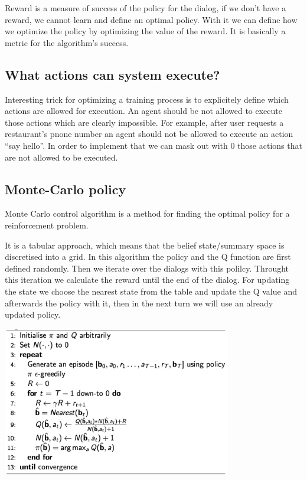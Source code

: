 \documentclass[12pt,titlepage,a4paper]{article}
\begin{document}
Reward is a measure of success of the policy for the dialog, if we don’t have a reward, we cannot learn and define an optimal policy. With it we can define how we optimize the policy by optimizing the value of the reward. It is basically a metric for the algorithm's success.

\subsection{What actions can system execute?}

Interesting trick for optimizing a training process is to explicitely define which actions are allowed for execution. An agent should be not allowed to execute those actions which are clearly impossible. For example, after user requests a restaurant's pnone number an agent should not be allowed to execute an action “say hello”. In order to implement that we can mask out with 0 those actions that are not allowed to be executed.

\subsection{Monte-Carlo policy}

Monte Carlo control algorithm is a method for finding the optimal policy for a reinforcement problem.

It is a tabular approach, which means that the belief state/summary space is discretised into a grid. In this algorithm the policy and the Q function are first defined randomly. Then we iterate over the dialogs with this polilcy. Throught this iteration we calculate the reward until the end of the dialog. For updating the state we choose the nearest state from the table and update the Q value and afterwards the policy with it, then in the next turn we will use an already updated policy. 

\begin{center}
    \includegraphics[width=10cm]{MCC.png}
\end{center}
\end{document}

